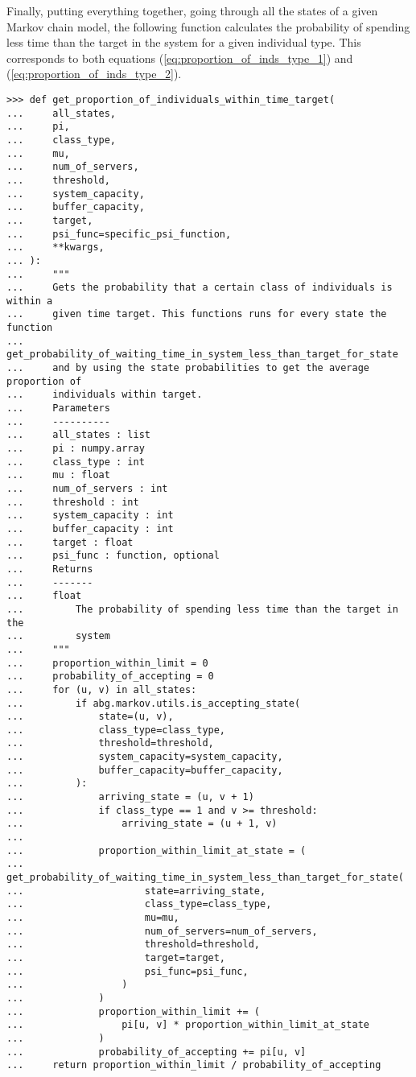 Finally, putting everything together, going through all the states of a given
Markov chain model, the following function calculates the probability of
spending less time than the target in the system for a given individual type.
This corresponds to both equations (\ref{eq:proportion_of_inds_type_1}) and
(\ref{eq:proportion_of_inds_type_2}).

\begin{lstlisting}[style=pystyle]
>>> def get_proportion_of_individuals_within_time_target(
...     all_states,
...     pi,
...     class_type,
...     mu,
...     num_of_servers,
...     threshold,
...     system_capacity,
...     buffer_capacity,
...     target,
...     psi_func=specific_psi_function,
...     **kwargs,
... ):
...     """
...     Gets the probability that a certain class of individuals is within a
...     given time target. This functions runs for every state the function
...     get_probability_of_waiting_time_in_system_less_than_target_for_state
...     and by using the state probabilities to get the average proportion of
...     individuals within target.
...     Parameters
...     ----------
...     all_states : list
...     pi : numpy.array
...     class_type : int
...     mu : float
...     num_of_servers : int
...     threshold : int
...     system_capacity : int
...     buffer_capacity : int
...     target : float
...     psi_func : function, optional
...     Returns
...     -------
...     float
...         The probability of spending less time than the target in the
...         system
...     """
...     proportion_within_limit = 0
...     probability_of_accepting = 0
...     for (u, v) in all_states:
...         if abg.markov.utils.is_accepting_state(
...             state=(u, v),
...             class_type=class_type,
...             threshold=threshold,
...             system_capacity=system_capacity,
...             buffer_capacity=buffer_capacity,
...         ):
...             arriving_state = (u, v + 1)
...             if class_type == 1 and v >= threshold:
...                 arriving_state = (u + 1, v)
... 
...             proportion_within_limit_at_state = (
...                 get_probability_of_waiting_time_in_system_less_than_target_for_state(
...                     state=arriving_state,
...                     class_type=class_type,
...                     mu=mu,
...                     num_of_servers=num_of_servers,
...                     threshold=threshold,
...                     target=target,
...                     psi_func=psi_func,
...                 )
...             )
...             proportion_within_limit += (
...                 pi[u, v] * proportion_within_limit_at_state
...             )
...             probability_of_accepting += pi[u, v]
...     return proportion_within_limit / probability_of_accepting

\end{lstlisting}

